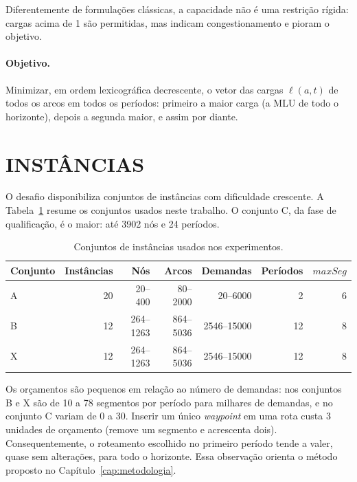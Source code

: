 Diferentemente de formulações clássicas, a capacidade não é uma restrição rígida: cargas acima de 1 são permitidas, mas indicam congestionamento e pioram o objetivo.

\paragraph{Objetivo.} Minimizar, em ordem lexicográfica decrescente, o vetor das cargas $\ell(a, t)$ de todos os arcos em todos os períodos: primeiro a maior carga (a MLU de todo o horizonte), depois a segunda maior, e assim por diante.

\section{\uppercase{Instâncias}}

O desafio disponibiliza conjuntos de instâncias com dificuldade crescente. A Tabela~\ref{tab:instancias} resume os conjuntos usados neste trabalho. O conjunto C, da fase de qualificação, é o maior: até 3902 nós e 24 períodos.

\begin{table}[H]
\centering
\caption{Conjuntos de instâncias usados nos experimentos.}
\label{tab:instancias}
\begin{tabular}{lrrrrrr}
\toprule
Conjunto & Instâncias & Nós & Arcos & Demandas & Períodos & $\mathit{maxSeg}$ \\
\midrule
A & 20 & 20--400 & 80--2000 & 20--6000 & 2 & 6 \\
B & 12 & 264--1263 & 864--5036 & 2546--15000 & 12 & 8 \\
X & 12 & 264--1263 & 864--5036 & 2546--15000 & 12 & 8 \\
\bottomrule
\end{tabular}
\end{table}

Os orçamentos são pequenos em relação ao número de demandas: nos conjuntos B e X são de 10 a 78 segmentos por período para milhares de demandas, e no conjunto C variam de 0 a 30. Inserir um único \textit{waypoint} em uma rota custa 3 unidades de orçamento (remove um segmento e acrescenta dois). Consequentemente, o roteamento escolhido no primeiro período tende a valer, quase sem alterações, para todo o horizonte. Essa observação orienta o método proposto no Capítulo~\ref{cap:metodologia}.

